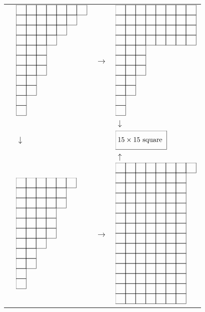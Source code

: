 \documentclass{tac}
\begin{document}
{      \begin{tabular}{llll}
      &$\xymatrix@W=.7pc @H=.7pc @R=0pc @C=0pc @*[F-]{~&~&~&~&~&~&~\\~&~&~&~&~&~\\~&~&~&~&~\\~&~&~&~\\~&~&~\\~&~&~\\~&~&~\\~&~\\~&~\\~\\~}$&$\to$&$\xymatrix@W=.7pc @H=.7pc @R=0pc @C=0pc @*[F-]{~&~&~&~&~&~&~&~\\~&~&~&~&~&~&~&~\\~&~&~&~&~&~&~&~\\~&~&~&~&~&~&~&~\\~&~&~\\~&~&~\\~&~&~\\~&~\\~&~\\~\\~}$ \\
      &&&$\downarrow$\\
      &$\downarrow$&&$\xymatrix@W=1.7pc @H=1.7pc @R=0pc @C=0pc @*[F-]{15\times 15 \text{ square }}$\\
      &&&$\uparrow$\\
      &$\xymatrix@W=.7pc @H=.7pc @R=0pc @C=0pc @*[F-]{~&~&~&~&~&~\\~&~&~&~&~\\~&~&~&~&~\\~&~&~&~\\~&~&~&~\\~&~&~&~\\~&~&~\\~&~\\~&~\\~\\~}$&$\to$&$\xymatrix@W=.7pc @H=.7pc @R=0pc @C=0pc @*[F-]{~&~&~&~&~&~&~&~\\~&~&~&~&~&~&~\\~&~&~&~&~&~&~\\~&~&~&~&~&~&~\\~&~&~&~&~&~&~\\~&~&~&~&~&~&~\\~&~&~&~&~&~&~\\~&~&~&~&~&~&~\\~&~&~&~&~&~&~\\~&~&~&~&~&~&~\\~&~&~&~&~&~&~\\~&~&~&~&~&~&~\\~&~&~&~&~&~&~\\~&~&~&~&~&~&~}$\\
      \end{tabular}

}
\end{document}
